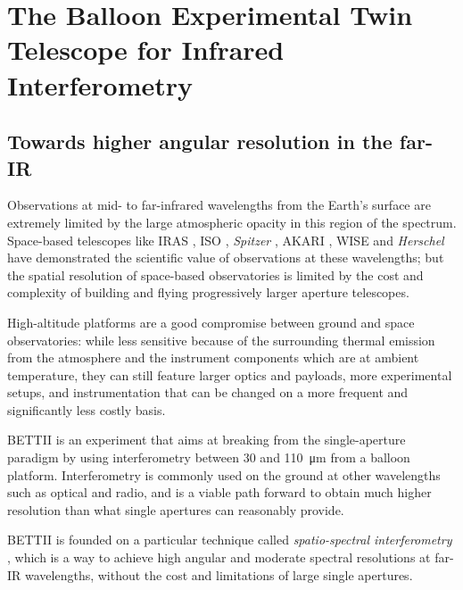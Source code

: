 \chapter{The Balloon Experimental Twin Telescope for Infrared Interferometry}
\label{chap:BETTII}

\section{Towards higher angular resolution in the far-IR}
Observations at mid- to far-infrared wavelengths from the Earth's surface are extremely 
limited by the large atmospheric opacity in this region of the spectrum. Space-based telescopes 
like IRAS \citep[12-100 \um;][]{1984ApJ...278L...1N}, ISO \citep[2.5-240 $\um$;][]{1996A&A...315L..27K}, \textit{Spitzer} \citep[3.6-160 $\um$;][]{2004ApJS..154....1W}, AKARI  \citep[1.7-180 $\um$;][]{2007PASJ...59S.369M}, WISE \citep[3.4-22 $\um$;][]{2010AJ....140.1868W} and \textit{Herschel} \citep[55-672 $\um$;][]{2010A&A...518L...1P} have demonstrated the scientific value of observations at 
these wavelengths; but the spatial resolution of space-based observatories is limited by the cost 
and complexity of building and flying progressively larger aperture telescopes. 

High-altitude platforms are a good compromise between ground and space observatories: while less sensitive because of the surrounding thermal emission from the atmosphere and the instrument components which are at ambient temperature, they can still feature larger optics and payloads, more experimental setups, and instrumentation that can be changed on a more frequent and significantly less costly basis.

BETTII is an experiment that aims at breaking from the single-aperture paradigm by using interferometry between 30 and \SI{110}{\micro\meter} from a balloon platform. Interferometry is commonly used on the ground at other wavelengths such as optical and radio, and is a viable path forward to obtain much higher resolution than what single apertures can reasonably provide.

BETTII is founded on a particular technique called \textit{spatio-spectral interferometry} \citep{Mariotti:1988vea}, which is a way to achieve 
high angular and moderate spectral resolutions at far-IR wavelengths, without the cost and limitations of large single apertures. 


%


